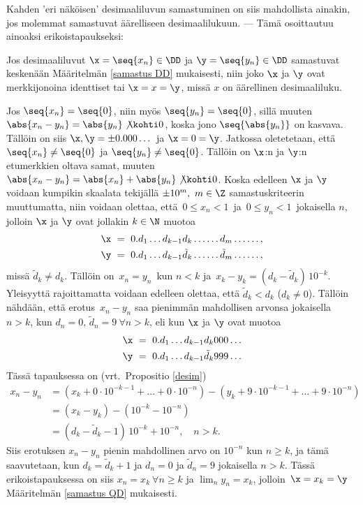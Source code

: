 Kahden 'eri näköisen' desimaaliluvun samastuminen on siis mahdollista ainakin, jos molemmat
samastuvat äärelliseen desimaalilukuun. --- Tämä osoittautuu ainoaksi erikoistapaukseksi:
\begin{Lause} \label{samastuslause DD} Jos desimaaliluvut $\x=\seq{x_n}\in\DD$ ja
$\y=\seq{y_n}\in\DD$ samastuvat keskenään Määritelmän \ref{samastus DD} mukaisesti, niin joko
$\x$ ja $\y$ ovat merkkijonoina identtiset tai $\x=x=\y$, missä $x$ on äärellinen desimaaliluku. 
\end{Lause}
\tod Jos $\seq{x_n}=\seq{0}$, niin myös $\seq{y_n}=\seq{0}$, sillä muuten
$\abs{x_n-y_n} = \abs{y_n} \not\kohti 0$, koska jono $\seq{\abs{y_n}}$ on kasvava. Tällöin on
siis $\x,\y=\pm 0.000 \ldots\,$ ja $\x=0=\y$. Jatkossa oletetetaan, että 
$\seq{x_n} \neq \seq{0}$ ja $\seq{y_n} \neq \seq{0}$. Tällöin on $\x$:n ja $\y$:n etumerkkien
oltava samat, muuten $\abs{x_n-y_n}=\abs{x_n}+\abs{y_n} \not\kohti 0$. Koska edelleen $\x$ ja
$\y$ voidaan kumpikin skaalata tekijällä $\pm 10^m,\ m \in \Z$ samastuskriteerin muuttumatta,
niin voidaan olettaa, että $\,0 \le x_n < 1\,$ ja $\,0 \le y_n <1\,$ jokaisella $n$, jolloin
$\x$ ja $\y$ ovat jollakin $k\in\N$ muotoa
\begin{align*}
\x\ &=\ 0.d_1 \ldots d_{k-1} d_k \ldots\ldots d_m \ldots\ldots, \\
\y\ &=\ 0.d_1 \ldots d_{k-1} \tilde{d}_k \ldots\ldots \tilde{d}_m \ldots\ldots,
\end{align*}
missä $\tilde{d}_k \neq d_k$. Tällöin on $\,x_n=y_n\,$ kun $n<k$ ja 
$\,x_k-y_k=(d_k-\tilde{d}_k)\,10^{-k}$. Yleisyyttä rajoittamatta voidaan edelleen olettaa, että 
$\tilde{d}_k < d_k$ ($d_k \neq 0$). Tällöin nähdään, että erotus $\,x_n-y_n$ saa pienimmän
mahdollisen arvonsa jokaisella $n>k$, kun $d_n=0,\,\tilde{d}_n=9\ \forall n>k$, eli kun
$\x$ ja $\y$ ovat muotoa
\begin{align*}
\x\ &=\ 0.d_1 \ldots d_{k-1} d_k 0 0 0 \ldots \\
\y\ &=\ 0.d_1 \ldots d_{k-1} \tilde{d}_k 9 9 9 \ldots
\end{align*} 
Tässä tapauksessa on (vrt.\ Propositio \ref{desim})
\begin{align*} \label{I-7: välitulos}
x_n-y_n &= \left(x_k + 0 \cdot 10^{-k-1} + \ldots + 0 \cdot 10^{-n}\right)
          -\left(y_k + 9 \cdot 10^{-k-1} + \ldots + 9 \cdot 10^{-n}\right) \\
        &= (x_k-y_k) - \left(10^{-k}-10^{-n}\right) \\
        &= (d_k-\tilde{d}_k-1)\,10^{-k} + 10^{-n}, \quad n>k.
\end{align*}
Siis erotuksen $x_n-y_n$ pienin mahdollinen arvo on $10^{-n}$ kun $n \ge k$, ja tämä
saavutetaan, kun $d_k=\tilde{d}_k+1$ ja $d_n=0$ ja $\tilde{d}_n=9$ jokaisella $n>k$. Tässä
erikoistapauksessa on siis $x_n=x_k\ \forall n \ge k$ ja $\lim_n y_n=x_k$, jolloin 
$\,\x=x_k=\y\,$ Määritelmän \ref{samastus QD} mukaisesti.

